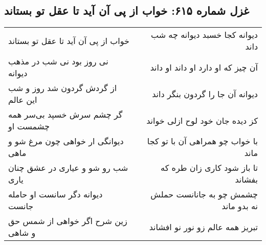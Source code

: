 \begin{center}
\section*{غزل شماره ۶۱۵: خواب از پی آن آید تا عقل تو بستاند}
\label{sec:0615}
\begin{longtable}{l p{0.5cm} r}
خواب از پی آن آید تا عقل تو بستاند
&&
دیوانه کجا خسبد دیوانه چه شب داند
\\
نی روز بود نی شب در مذهب دیوانه
&&
آن چیز که او دارد او داند او داند
\\
از گردش گردون شد روز و شب این عالم
&&
دیوانه آن جا را گردون بنگر داند
\\
گر چشم سرش خسپد بی‌سر همه چشمست او
&&
کز دیده جان خود لوح ازلی خواند
\\
دیوانگی ار خواهی چون مرغ شو و ماهی
&&
با خواب چو همراهی آن با تو کجا ماند
\\
شب رو شو و عیاری در عشق چنان یاری
&&
تا باز شود کاری زان طره که بفشاند
\\
دیوانه دگر سانست او حامله جانست
&&
چشمش چو به جانانست حملش نه بدو ماند
\\
زین شرح اگر خواهی از شمس حق و شاهی
&&
تبریز همه عالم زو نور نو افشاند
\\
\end{longtable}
\end{center}
